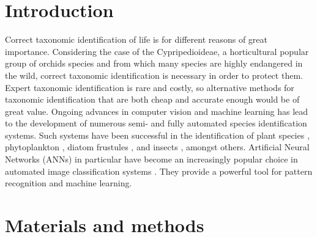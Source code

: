 \documentclass[twocolumn]{bmcart}
\begin{document}

\section{Introduction}
\label{sec:introduction}

Correct taxonomic identification of life is for different reasons of great importance. Considering the case of the Cypripedioideae, a horticultural popular group of orchids species and from which many species are highly endangered in the wild, correct taxonomic identification is necessary in order to protect them. Expert taxonomic identification is rare and costly, so alternative methods for taxonomic identification that are both cheap and accurate enough would be of great value. Ongoing advances in computer vision and machine learning has lead to the development of numerous semi- and fully automated species identification systems. Such systems have been successful in the identification of plant species \cite{Arinkin2014, Nilsback2008, Sanz2013}, phytoplankton \cite{Boddy1994}, diatom frustules \cite{Kloster2014}, and insects \cite{Weeks1999,Kang2012}, amongst others. Artificial Neural Networks (ANNs) in particular have become an increasingly popular choice in automated image classification systems \cite{Weeks1997}. They provide a powerful tool for pattern recognition and machine learning.

\section{Materials and methods}
\label{sec:methods}

\end{document}
